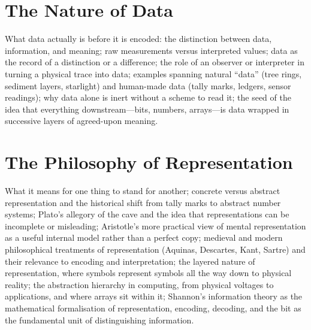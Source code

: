 %

\chapter{The Nature of Data}
\label{ch:nature-of-data}

What data actually is before it is encoded: the distinction between data,
information, and meaning; raw measurements versus interpreted values; data
as the record of a distinction or a difference; the role of an observer or
interpreter in turning a physical trace into data; examples spanning natural
``data'' (tree rings, sediment layers, starlight) and human-made data (tally
marks, ledgers, sensor readings); why data alone is inert without a scheme
to read it; the seed of the idea that everything downstream---bits, numbers,
arrays---is data wrapped in successive layers of agreed-upon meaning.

\chapter{The Philosophy of Representation}
\label{ch:philosophy-of-representation}

What it means for one thing to stand for another; concrete versus abstract
representation and the historical shift from tally marks to abstract number
systems; Plato's allegory of the cave and the idea that representations can
be incomplete or misleading; Aristotle's more practical view of mental
representation as a useful internal model rather than a perfect copy;
medieval and modern philosophical treatments of representation (Aquinas,
Descartes, Kant, Sartre) and their relevance to encoding and interpretation;
the layered nature of representation, where symbols represent symbols all the
way down to physical reality; the abstraction hierarchy in computing, from
physical voltages to applications, and where arrays sit within it; Shannon's
information theory as the mathematical formalisation of representation,
encoding, decoding, and the bit as the fundamental unit of distinguishing
information.


